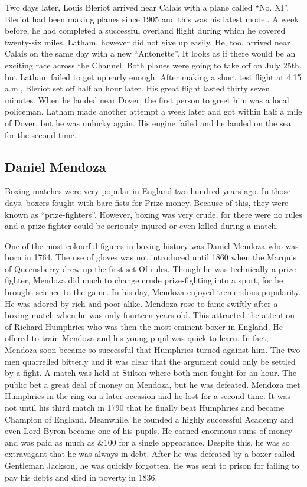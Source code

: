 \documentclass[11pt]{article}
\begin{document}
Two days later, Louis Bleriot arrived near Calais with a plane called ``No. XI''. Bleriot had been making planes since 1905 and this was his latest model. A week before, he had completed a successful overland flight during which he covered twenty-six miles. Latham, however did not give up easily. He, too, arrived near Calais on the same day with a new ``Antonette''. It looks as if there would be an exciting race across the Channel. Both planes were going to take off on July 25th, but Latham failed to get up early enough. After making a short test flight at 4.15 a.m., Bleriot set off half an hour later. His great flight lasted thirty seven minutes. When he landed near Dover, the first person to greet him was a local policeman. Latham made another attempt a week later and got within half a mile of Dover, but he was unlucky again. His engine failed and he landed on the sea for the second time. 
\subsection{Daniel Mendoza}
\label{sec-1-21}

Boxing matches were very popular in England two hundred years ago. In those days, boxers fought with bare fists for Prize money. Because of this, they were known as ``prize-fighters''. However, boxing was very crude, for there were no rules and a prize-fighter could be seriously injured or even killed during a match. 

One of the most colourful figures in boxing history was Daniel Mendoza who was born in 1764. The use of gloves was not introduced until 1860 when the Marquis of Queensberry drew up the first set Of rules. Though he was technically a prize-fighter, Mendoza did much to change crude prize-fighting into a sport, for he brought science to the game. In his day, Mendoza enjoyed tremendous popularity. He was adored by rich and poor alike. Mendoza rose to fame swiftly after a boxing-match when he was only fourteen years old. This attracted the attention of Richard Humphries who was then the most eminent boxer in England. He offered to train Mendoza and his young pupil was quick to learn. In fact, Mendoza soon became so successful that Humphries turned against him. The two men quarrelled bitterly and it was clear that the argument could only be settled by a fight. A match was held at Stilton where both men fought for an hour. The public bet a great deal of money on Mendoza, but he was defeated. Mendoza met Humphries in the ring on a later occasion and he lost for a second time. It was not until his third match in 1790 that he finally beat Humphries and became Champion of England. Meanwhile, he founded a highly successful Academy and even Lord Byron became one of his pupils. He earned enormous sums of money and was paid as much as \&100 for a single appearance. Despite this, he was so extravagant that he was always in debt. After he was defeated by a boxer called Gentleman Jackson, he was quickly forgotten. He was sent to prison for failing to pay his debts and died in poverty in 1836. 
\end{document}
